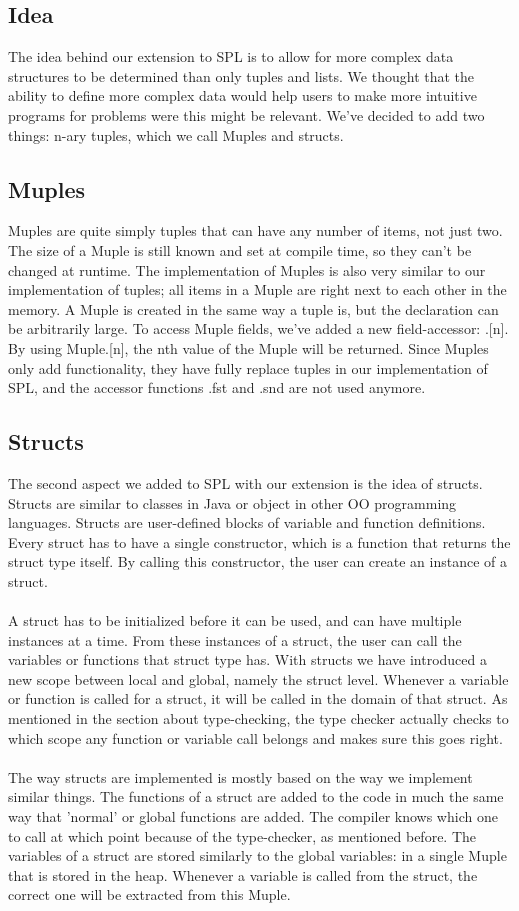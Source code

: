 \documentclass[10pt,a4paper]{article}
\begin{document}
\subsection{Idea}
The idea behind our extension to SPL is to allow for more complex data structures to be determined than only tuples and lists. We thought that the ability to define more complex data would help users to make more intuitive programs for problems were this might be relevant. We've decided to add two things: n-ary tuples, which we call Muples and structs. 
\subsection{Muples}
Muples are quite simply tuples that can have any number of items, not just two. The size of a Muple is still known and set at compile time, so they can't be changed at runtime. The implementation of Muples is also very similar to our implementation of tuples; all items in a Muple are right next to each other in the memory. A Muple is created in the same way a tuple is, but the declaration can be arbitrarily large. To access Muple fields, we've added a new field-accessor: .[n]. By using Muple.[n], the nth value of the Muple will be returned. Since Muples only add functionality, they have fully replace tuples in our implementation of SPL, and the accessor functions .fst and .snd are not used anymore.
\subsection{Structs}
The second aspect we added to SPL with our extension is the idea of structs. Structs are similar to classes in Java or object in other OO programming languages. Structs are user-defined blocks of variable and function definitions. Every struct has to have a single constructor, which is a function that returns the struct type itself. By calling this constructor, the user can create an instance of a struct.\\
\\
A struct has to be initialized before it can be used, and can have multiple instances at a time. From these instances of a struct, the user can call the variables or functions that struct type has. With structs we have introduced a new scope between local and global, namely the struct level. Whenever a variable or function is called for a struct, it will be called in the domain of that struct. As mentioned in the section about type-checking, the type checker actually checks to which scope any function or variable call belongs and makes sure this goes right.\\
\\
The way structs are implemented is mostly based on the way we implement similar things. The functions of a struct are added to the code in much the same way that 'normal' or global functions are added. The compiler knows which one to call at which point because of the type-checker, as mentioned before. The variables of a struct are stored similarly to the global variables: in a single Muple that is stored in the heap. Whenever a variable is called from the struct, the correct one will be extracted from this Muple.
\end{document}
